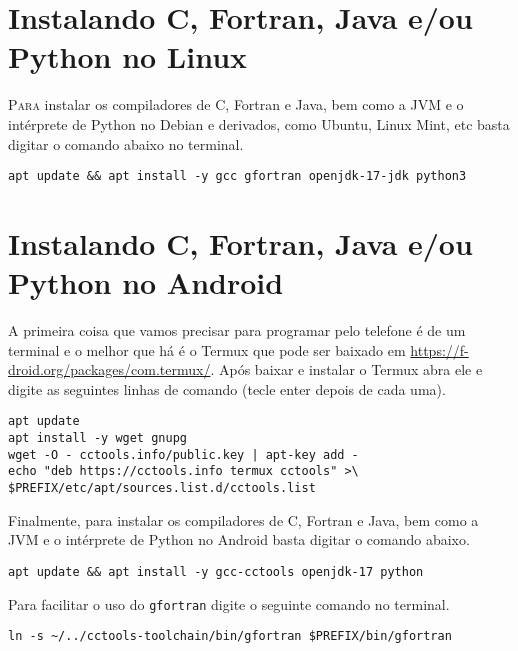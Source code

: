 \chapter{Instalando C, Fortran, Java e/ou Python no Linux}

\lettrine{P}{ara} instalar os compiladores de C, Fortran e Java, bem como a JVM
e o intérprete de Python
no Debian e derivados, como Ubuntu, Linux Mint, etc basta digitar
o comando abaixo no terminal.
\begin{lstlisting}[style=bash]
apt update && apt install -y gcc gfortran openjdk-17-jdk python3
\end{lstlisting}

\chapter{Instalando C, Fortran, Java e/ou Python no Android}

\lettrine{A}{} primeira coisa que vamos precisar para programar pelo
telefone é de um terminal e o melhor que há é o Termux
que pode ser baixado em
\url{https://f-droid.org/packages/com.termux/}. Após baixar e instalar o Termux
abra ele e digite as seguintes linhas de comando (tecle enter depois de cada uma).
\begin{lstlisting}[style=bash]
apt update
apt install -y wget gnupg
wget -O - cctools.info/public.key | apt-key add -
echo "deb https://cctools.info termux cctools" >\
$PREFIX/etc/apt/sources.list.d/cctools.list
\end{lstlisting}

Finalmente, para
instalar os compiladores de C, Fortran e Java, bem como a JVM
e o intérprete de Python
no Android basta digitar
o comando abaixo.
\begin{lstlisting}[style=bash]
apt update && apt install -y gcc-cctools openjdk-17 python
\end{lstlisting}

Para facilitar o uso do \texttt{gfortran} digite o
seguinte comando no terminal.
\begin{lstlisting}[style=bash]
ln -s ~/../cctools-toolchain/bin/gfortran $PREFIX/bin/gfortran
\end{lstlisting}


